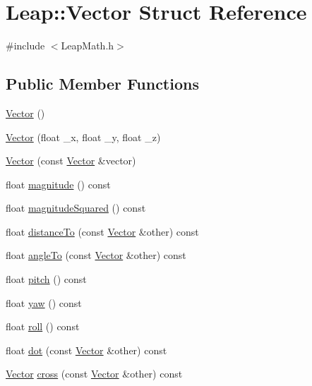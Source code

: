\hypertarget{struct_leap_1_1_vector}{\section{Leap\+:\+:Vector Struct Reference}
\label{struct_leap_1_1_vector}
}


{\ttfamily \#include $<$Leap\+Math.\+h$>$}

\subsection*{Public Member Functions}
\begin{DoxyCompactItemize}
\item 
\hyperlink{struct_leap_1_1_vector_a0d7a6417136be2cde1ddd56c39244929}{Vector} ()
\item 
\hyperlink{struct_leap_1_1_vector_a58bde18133811a15d122a785f0b36b80}{Vector} (float \+\_\+x, float \+\_\+y, float \+\_\+z)
\item 
\hyperlink{struct_leap_1_1_vector_a2b271c5d88e466f17771e62bd8faea94}{Vector} (const \hyperlink{struct_leap_1_1_vector}{Vector} \&vector)
\item 
float \hyperlink{struct_leap_1_1_vector_ab7955521f3b80e2b2ad9b67330345476}{magnitude} () const 
\item 
float \hyperlink{struct_leap_1_1_vector_a81226e9b68a8ee06124237145d16b77c}{magnitude\+Squared} () const 
\item 
float \hyperlink{struct_leap_1_1_vector_adfda206e0659c44a2eb632bc2a8cd82a}{distance\+To} (const \hyperlink{struct_leap_1_1_vector}{Vector} \&other) const 
\item 
float \hyperlink{struct_leap_1_1_vector_ac8db3180325f86971f1089ef17808c24}{angle\+To} (const \hyperlink{struct_leap_1_1_vector}{Vector} \&other) const 
\item 
float \hyperlink{struct_leap_1_1_vector_a206cee5e82cc8f860edae69c4f101a49}{pitch} () const 
\item 
float \hyperlink{struct_leap_1_1_vector_aa4bdfa69695be1e5a6db629685538239}{yaw} () const 
\item 
float \hyperlink{struct_leap_1_1_vector_a11dc02be2e993142ac422b7b3a7428c1}{roll} () const 
\item 
float \hyperlink{struct_leap_1_1_vector_a80f93cc43a55259acd366ecefcb3766a}{dot} (const \hyperlink{struct_leap_1_1_vector}{Vector} \&other) const 
\item 
\hyperlink{struct_leap_1_1_vector}{Vector} \hyperlink{struct_leap_1_1_vector_ad67607a021ae7e8913efea37aac55087}{cross} (const \hyperlink{struct_leap_1_1_vector}{Vector} \&other) const 

\end{DoxyCompactItemize}
